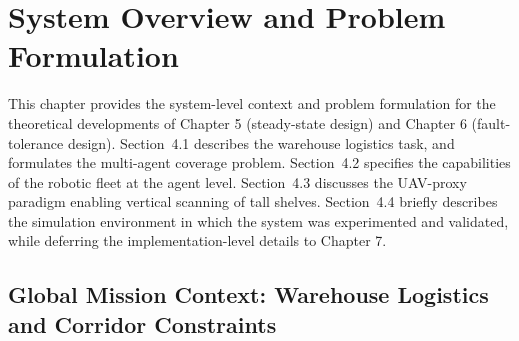 \chapter{System Overview and Problem Formulation\label{cha:chapter4}}


This chapter provides the system-level context and problem formulation for the theoretical developments of Chapter 5 (steady-state design) and Chapter 6 (fault-tolerance design). Section~4.1 describes the warehouse logistics task, and formulates the multi-agent coverage problem. Section~4.2 specifies the capabilities of the robotic fleet at the agent level. Section~4.3 discusses the UAV-proxy paradigm enabling vertical scanning of tall shelves. Section~4.4 briefly describes the simulation environment in which the system was experimented and validated, while deferring the implementation-level details to Chapter 7.

\section{Global Mission Context: Warehouse Logistics and Corridor Constraints}

